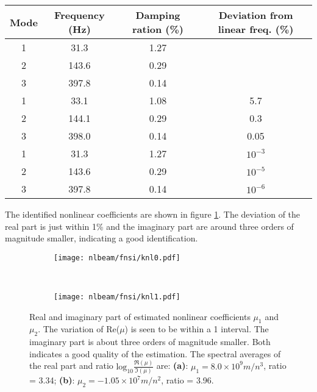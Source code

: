 \begin{center}
  \begin{tabular}{*{4}{c}}
    \hline
    Mode & Frequency (Hz) & Damping ration (\%) & Deviation from linear freq. (\%) \\
    \hline
    1 & 31.3 & 1.27 \\
    2 & 143.6 & 0.29 \\
    3 & 397.8 & 0.14 \\
    \hline
    1 & 33.1 & 1.08 & 5.7 \\
    2 & 144.1 & 0.29 & 0.3 \\
    3 & 398.0 & 0.14 & 0.05 \\
    \hline
    1 & 31.3 & 1.27 & $10^{-3}$ \\
    2 & 143.6 & 0.29 & $10^{-5}$ \\
    3 & 397.8 & 0.14 & $10^{-6}$ \\
    \hline
  \end{tabular}
  \label{tab:nlbeam_par}
\end{center}

The identified nonlinear coefficients are shown in figure \ref{fig:nlbeam_knl}.
The deviation of the real part is just within 1\% and the imaginary part are
around three orders of magnitude smaller, indicating a good identification.

\begin{figure}[!ht]
  \centering
  \begin{subfigure}[b]{0.45\textwidth}
    \texttt{[image: nlbeam/fnsi/knl0.pdf]}
    \caption{}
  \end{subfigure}
  ~
  \begin{subfigure}[b]{0.45\textwidth}
    \texttt{[image: nlbeam/fnsi/knl1.pdf]}
    \caption{}
  \end{subfigure}
  \caption{Real and imaginary part of estimated nonlinear coefficients $\mu_1$
    and $\mu_2$. The variation of Re($\mu$) is seen to be within a 1 interval.
    The imaginary part is about three orders of magnitude smaller. Both
    indicates a good quality of the estimation. The spectral averages of the
    real part and ratio $\text{log}_{10}\frac{\Re(\mu)}{\Im(\mu)}$ are:
    \textbf{(a)}: $\mu_1 = 8.0 \times 10^9 m/n^3$, ratio = 3.34;
    \textbf{(b)}: $\mu_2 = -1.05 \times 10^7 m/n^2$, ratio = 3.96.
  }
  \label{fig:nlbeam_knl}
\end{figure}


